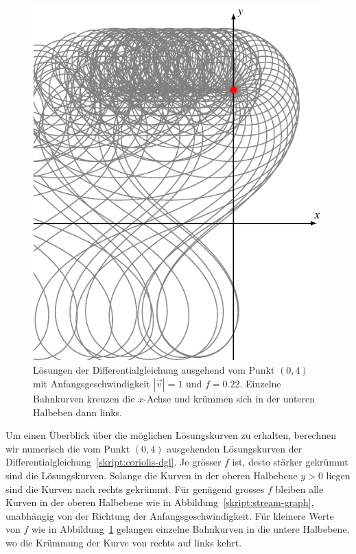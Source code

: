 \begin{figure}
\centering
\includegraphics{chapters/1/cross.pdf}
\caption{
Lösungen der Differentialgleichung ausgehend vom Punkt $(0,4)$
mit Anfangsgeschwindigkeit $|\vec{v}|=1$ und $f=0.22$.
Einzelne Bahnkurven kreuzen die $x$-Achse und krümmen sich in der unteren
Halbeben dann links.
\label{skript:cross-graph}}
\end{figure}

Um einen Überblick über die möglichen Lösungskurven zu erhalten, berechnen
wir numerisch die vom Punkt $(0,4)$ ausgehenden Lösungskurven 
der Differentialgleichung~\ref{skript:coriolis-dgl}.
Je grösser $f$ ist, desto stärker gekrümmt sind die Lösungskurven.
Solange die Kurven in der oberen Halbebene $y>0$ liegen sind die Kurven
nach rechts gekrümmt.
Für genügend grosses $f$ bleiben alle Kurven in der oberen
Halbebene wie in Abbildung~\ref{skript:stream-graph}, unabhängig
von der Richtung der Anfangsgeschwindigkeit.
Für kleinere Werte von $f$ wie in Abbildung~\ref{skript:cross-graph}
gelangen einzelne Bahnkurven in die untere Halbebene, wo die Krümmung
der Kurve von rechts auf links kehrt.

